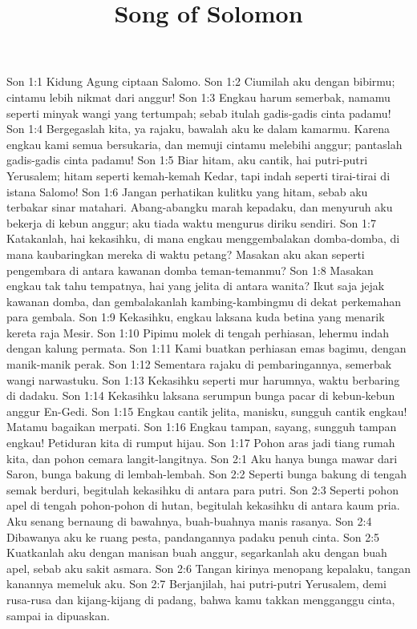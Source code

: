 

\title{Song of Solomon}

Son 1:1  Kidung Agung ciptaan Salomo.
Son 1:2  Ciumilah aku dengan bibirmu; cintamu lebih nikmat dari anggur!
Son 1:3  Engkau harum semerbak, namamu seperti minyak wangi yang tertumpah; sebab itulah gadis-gadis cinta padamu!
Son 1:4  Bergegaslah kita, ya rajaku, bawalah aku ke dalam kamarmu. Karena engkau kami semua bersukaria, dan memuji cintamu melebihi anggur; pantaslah gadis-gadis cinta padamu!
Son 1:5  Biar hitam, aku cantik, hai putri-putri Yerusalem; hitam seperti kemah-kemah Kedar, tapi indah seperti tirai-tirai di istana Salomo!
Son 1:6  Jangan perhatikan kulitku yang hitam, sebab aku terbakar sinar matahari. Abang-abangku marah kepadaku, dan menyuruh aku bekerja di kebun anggur; aku tiada waktu mengurus diriku sendiri.
Son 1:7  Katakanlah, hai kekasihku, di mana engkau menggembalakan domba-domba, di mana kaubaringkan mereka di waktu petang? Masakan aku akan seperti pengembara di antara kawanan domba teman-temanmu?
Son 1:8  Masakan engkau tak tahu tempatnya, hai yang jelita di antara wanita? Ikut saja jejak kawanan domba, dan gembalakanlah kambing-kambingmu di dekat perkemahan para gembala.
Son 1:9  Kekasihku, engkau laksana kuda betina yang menarik kereta raja Mesir.
Son 1:10  Pipimu molek di tengah perhiasan, lehermu indah dengan kalung permata.
Son 1:11  Kami buatkan perhiasan emas bagimu, dengan manik-manik perak.
Son 1:12  Sementara rajaku di pembaringannya, semerbak wangi narwastuku.
Son 1:13  Kekasihku seperti mur harumnya, waktu berbaring di dadaku.
Son 1:14  Kekasihku laksana serumpun bunga pacar di kebun-kebun anggur En-Gedi.
Son 1:15  Engkau cantik jelita, manisku, sungguh cantik engkau! Matamu bagaikan merpati.
Son 1:16  Engkau tampan, sayang, sungguh tampan engkau! Petiduran kita di rumput hijau.
Son 1:17  Pohon aras jadi tiang rumah kita, dan pohon cemara langit-langitnya.
Son 2:1  Aku hanya bunga mawar dari Saron, bunga bakung di lembah-lembah.
Son 2:2  Seperti bunga bakung di tengah semak berduri, begitulah kekasihku di antara para putri.
Son 2:3  Seperti pohon apel di tengah pohon-pohon di hutan, begitulah kekasihku di antara kaum pria. Aku senang bernaung di bawahnya, buah-buahnya manis rasanya.
Son 2:4  Dibawanya aku ke ruang pesta, pandangannya padaku penuh cinta.
Son 2:5  Kuatkanlah aku dengan manisan buah anggur, segarkanlah aku dengan buah apel, sebab aku sakit asmara.
Son 2:6  Tangan kirinya menopang kepalaku, tangan kanannya memeluk aku.
Son 2:7  Berjanjilah, hai putri-putri Yerusalem, demi rusa-rusa dan kijang-kijang di padang, bahwa kamu takkan mengganggu cinta, sampai ia dipuaskan.
